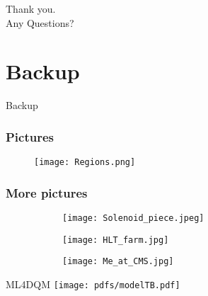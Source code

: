 \documentclass[aspectratio=1610]{beamer}
\begin{document}
\begin{frame}
	\begin{center}
		{\Huge Thank you.\\ \vspace{1cm} Any Questions?}
	\end{center}
\end{frame}



\appendix

\section{Backup}

\begin{frame}
	\begin{center}
		{\Huge Backup}
	\end{center}
\end{frame}

\begin{frame}
	\frametitle{Pictures}
	\begin{figure}
		\centering
		\texttt{[image: Regions.png]}
	\end{figure}
\end{frame}

\begin{frame}
	\frametitle{More pictures}
	\begin{figure}
		\begin{subfigure}{.32\linewidth}
			\centering
			\texttt{[image: Solenoid\_piece.jpeg]}
		\end{subfigure}
		\begin{subfigure}{.32\linewidth}
			\centering
			\texttt{[image: HLT\_farm.jpg]}
		\end{subfigure}
		\begin{subfigure}{.32\linewidth}
			\centering
			\texttt{[image: Me\_at\_CMS.jpg]}
		\end{subfigure}
	\end{figure}
\end{frame}

\begin{frame}{ML4DQM}
	\centering
	\texttt{[image: pdfs/modelTB.pdf]}
\end{frame}
\end{document}
